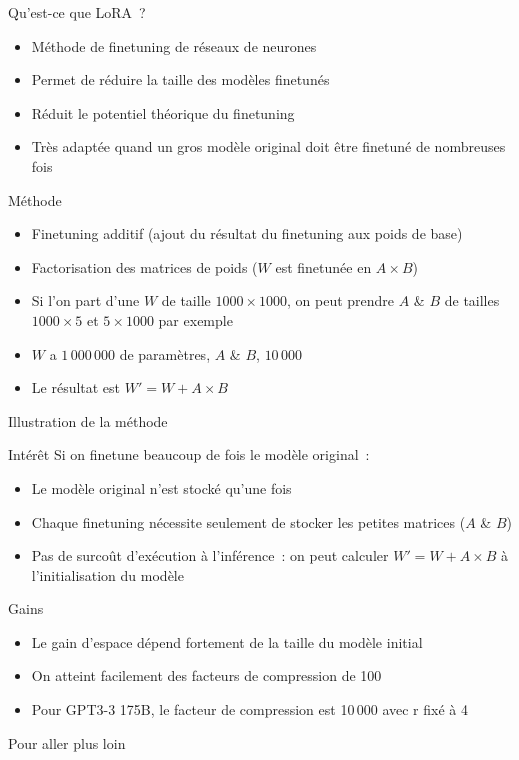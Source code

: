 \begin{frame}{Qu'est-ce que LoRA~?}
  \begin{itemize}
    \item Méthode de finetuning de réseaux de neurones
    \item Permet de réduire la taille des modèles finetunés
    \item Réduit le potentiel théorique du finetuning
    \item Très adaptée quand un gros modèle original doit être finetuné de nombreuses fois
  \end{itemize}
\end{frame}

\begin{frame}{Méthode}
  \begin{itemize}
    \item Finetuning additif (ajout du résultat du finetuning aux poids de base)
    \item Factorisation des matrices de poids ($W$ est finetunée en $A \times B$)
    \item Si l'on part d'une $W$ de taille $1000 \times 1000$, on peut prendre $A$ \& $B$ de tailles $1000 \times 5$ et $5 \times 1000$ par exemple
    \item $W$ a $1\,000\,000$ de paramètres, $A$ \& $B$, $10\,000$
    \item Le résultat est $W' = W + A \times B$
  \end{itemize}
\end{frame}

\begin{frame}{Illustration de la méthode}
\end{frame}

\begin{frame}{Intérêt}
  Si on finetune beaucoup de fois le modèle original~:
  \begin{itemize}
    \item Le modèle original n'est stocké qu'une fois
    \item Chaque finetuning nécessite seulement de stocker les petites matrices ($A$ \& $B$)
    \item Pas de surcoût d'exécution à l'inférence~: on peut calculer $W' = W + A \times B$ à l'initialisation du modèle
  \end{itemize}
\end{frame}

\begin{frame}{Gains}
  \begin{itemize}
    \item Le gain d'espace dépend fortement de la taille du modèle initial
    \item On atteint facilement des facteurs de compression de 100
    \item Pour GPT3-3 175B, le facteur de compression est 10$\,$000 avec r fixé à 4
  \end{itemize}
\end{frame}

\begin{frame}{Pour aller plus loin}
\end{frame}
